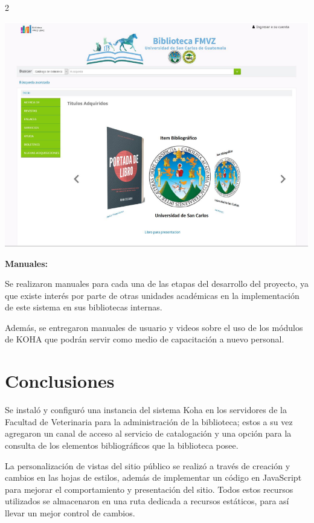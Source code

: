 \documentclass[12pt,spanish,Letterpaper,openany]{book}
\begin{document}
\begin {multicols}{2}
\begin {flushleft}
\noindent\begin{minipage}[c]{\columnwidth}

\includegraphics[width=1\linewidth]{images/05_03}

\end{minipage}

\end {flushleft}

\textbf{Manuales:}

Se realizaron manuales para cada una de las etapas del desarrollo del proyecto, ya que existe interés por parte de otras unidades académicas en la implementación de este sistema en sus bibliotecas internas.

Además, se entregaron manuales de usuario y videos sobre el uso de los módulos de KOHA que podrán servir como medio de capacitación a nuevo personal.

\hypertarget{conclusiones-3}{%
\section{Conclusiones}\label{conclusiones-3}}

Se instaló y configuró una instancia del sistema Koha en los servidores de la Facultad de Veterinaria para la administración de la biblioteca; estos a su vez agregaron un canal de acceso al servicio de catalogación y una opción para la consulta de los elementos bibliográficos que la biblioteca posee.

La personalización de vistas del sitio público se realizó a través de creación y cambios en las hojas de estilos, además de implementar un código en JavaScript para mejorar el comportamiento y presentación del sitio. Todos estos recursos utilizados se almacenaron en una ruta dedicada a recursos estáticos, para así llevar un mejor control de cambios.


\end{multicols}
\end{document}

